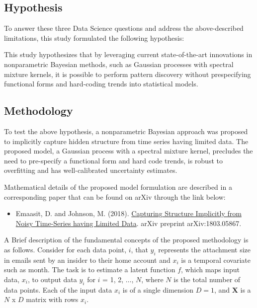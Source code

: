 \documentclass[11pt]{article}
\providecommand{\tightlist}{%
      \setlength{\itemsep}{0pt}\setlength{\parskip}{0pt}}
\begin{document}
\subsection{Hypothesis}\label{hypothesis}

To answer these three Data Science questions and address the
above-described limitations, this study formulated the following
hypothesis:

This study hypothesizes that by leveraging current state-of-the-art
innovations in nonparametric Bayesian methods, such as Gaussian
processes with spectral mixture kernels, it is possible to perform
pattern discovery without prespecifying functional forms and hard-coding
trends into statistical models.

\subsection{Methodology}\label{methodology}

To test the above hypothesis, a nonparametric Bayesian approach was
proposed to implicitly capture hidden structure from time series having
limited data. The proposed model, a Gaussian process with a spectral
mixture kernel, precludes the need to pre-specify a functional form and
hard code trends, is robust to overfitting and has well-calibrated
uncertainty estimates.

Mathematical details of the proposed model formulation are described in
a corresponding paper that can be found on arXiv through the link below:

\begin{itemize}
\tightlist
\item
  Emaasit, D. and Johnson, M. (2018).
  \href{https://arxiv.org/abs/1803.05867}{Capturing Structure Implicitly
  from Noisy Time-Series having Limited Data}. arXiv preprint
  arXiv:1803.05867.
\end{itemize}

A Brief description of the fundamental concepts of the proposed
methodology is as follows. Consider for each data point, \(i\), that
\(y_i\) represents the attachment size in emails sent by an insider to
their home account and \(x_i\) is a temporal covariate such as month.
The task is to estimate a latent function \(f\), which maps input data,
\(x_i\), to output data \(y_i\) for \(i\) = 1, 2, \(\ldots{}\), \(N\),
where \(N\) is the total number of data points. Each of the input data
\(x_i\) is of a single dimension \(D = 1\), and \(\textbf{X}\) is a
\(N\) x \(D\) matrix with rows \(x_i\).
\end{document}
